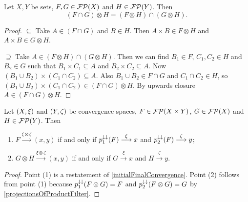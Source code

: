 \begin{lemma} \label{intersectionProductFilters}
Let $X,Y$ be sets, $F,G\in \operatorname{\mathcal{FP}}(X)$ and $H\in\operatorname{\mathcal{FP}}(Y)$. Then
\[ (F\cap G)\otimes H = (F\otimes H)\cap (G\otimes H). \]
\end{lemma}
\begin{proof}
$\boxed{\subseteq}$ Take $A\in (F\cap G)$ and $B\in H$. Then $A\times B\in F\otimes H$ and $A\times B\in G\otimes H$.

$\boxed{\supseteq}$ Take $A \in (F\otimes H)\cap (G\otimes H)$. Then we can find $B_1\in F$, $C_1,C_2\in H$ and $B_2\in G$ such that $B_1\times C_1 \subseteq A$ and $B_2\times C_2 \subseteq A$. Now $(B_1\cup B_2)\times (C_1\cap C_2) \subseteq A$. Also $B_1\cup B_2 \in F\cap G$ and $C_1\cap C_2 \in H$, so $(B_1\cup B_2)\times (C_1\cap C_2) \in (F\cap G)\otimes H$. By upwards closure $A\in (F\cap G)\otimes H$.
\end{proof}

\begin{lemma} \label{convergenceFiniteProductFilter}
Let $\left( X,\xi \right)$ and $\left( Y,\zeta \right)$ be convergence spaces, $F\in \operatorname{\mathcal{FP}}(X\times Y)$, $G\in \operatorname{\mathcal{FP}}(X)$ and $H\in \operatorname{\mathcal{FP}}(Y)$. Then
\begin{enumerate}
\item $F \overset{\xi \otimes \zeta}{\longrightarrow} (x,y)$ \textup{if and only if} $p_1^{\downarrow\downarrow}(F) \overset{\xi}{\longrightarrow} x$ and $p_2^{\downarrow\downarrow}(F) \overset{\zeta}{\longrightarrow} y$;
\item $G\otimes H \overset{\xi \otimes \zeta}{\longrightarrow} (x,y)$ \textup{if and only if} $G \overset{\xi}{\longrightarrow} x$ and $H \overset{\zeta}{\longrightarrow} y$.
\end{enumerate}
\end{lemma}
\begin{proof}
Point (1) is a restatement of \ref{initialFinalConvergence}. Point (2) follows from point (1) because $p_1^{\downarrow\downarrow}(F\otimes G) = F$ and $p_2^{\downarrow\downarrow}(F\otimes G) = G$ by \ref{projectionsOfProductFilter}.
\end{proof}


